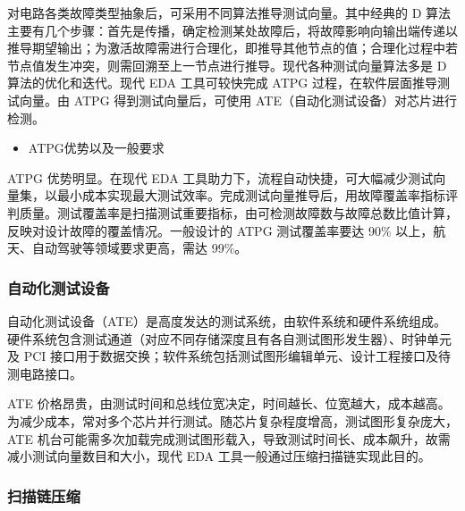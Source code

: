 对电路各类故障类型抽象后，可采用不同算法推导测试向量。其中经典的 D
算法主要有几个步骤：首先是传播，确定检测某处故障后，将故障影响向输出端传递以推导期望输出；为激活故障需进行合理化，即推导其他节点的值；合理化过程中若节点值发生冲突，则需回溯至上一节点进行推导。现代各种测试向量算法多是
D 算法的优化和迭代。现代 EDA 工具可较快完成 ATPG
过程，在软件层面推导测试向量。由 ATPG 得到测试向量后，可使用
ATE（自动化测试设备）对芯片进行检测。

\begin{itemize}
\tightlist
\item
  ATPG优势以及一般要求
\end{itemize}

ATPG 优势明显。在现代 EDA
工具助力下，流程自动快捷，可大幅减少测试向量集，以最小成本实现最大测试效率。完成测试向量推导后，用故障覆盖率指标评判质量。测试覆盖率是扫描测试重要指标，由可检测故障数与故障总数比值计算，反映对设计故障的覆盖情况。一般设计的
ATPG 测试覆盖率要达 90\% 以上，航天、自动驾驶等领域要求更高，需达 99\%。

\subsubsection{自动化测试设备}\label{sec:16-chip-frontend-031}

自动化测试设备（ATE）是高度发达的测试系统，由软件系统和硬件系统组成。硬件系统包含测试通道（对应不同存储深度且有各自测试图形发生器）、时钟单元及
PCI
接口用于数据交换；软件系统包括测试图形编辑单元、设计工程接口及待测电路接口。

ATE
价格昂贵，由测试时间和总线位宽决定，时间越长、位宽越大，成本越高。为减少成本，常对多个芯片并行测试。随芯片复杂程度增高，测试图形复杂庞大，ATE
机台可能需多次加载完成测试图形载入，导致测试时间长、成本飙升，故需减小测试向量数目和大小，现代
EDA 工具一般通过压缩扫描链实现此目的。

\subsubsection{扫描链压缩}\label{sec:16-chip-frontend-032}

